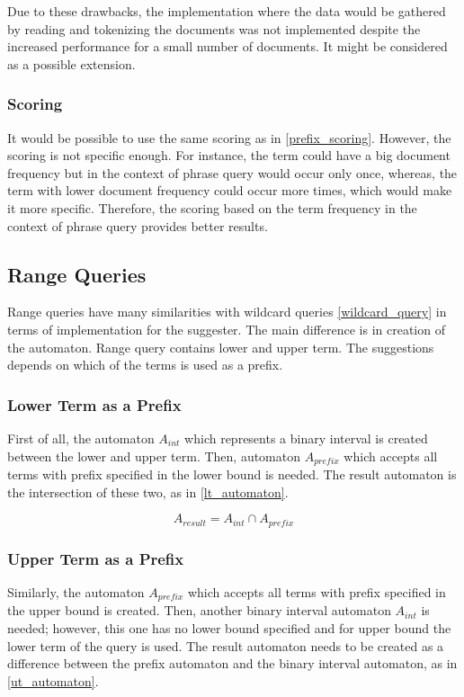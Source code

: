Due to these drawbacks, the implementation where the data would be gathered by reading and tokenizing the documents was not
implemented despite the increased performance for a small number of documents. It might be considered as a possible
extension.

\subsubsection{Scoring}
It would be possible to use the same scoring as in \ref{prefix_scoring}. However, the scoring is not specific enough.
For instance, the term could have a big document frequency but in the context of phrase query would occur only once,
whereas, the term with lower document frequency could occur more times, which would make it more specific. Therefore,
the scoring based on the term frequency in the context of phrase query provides better results.

\subsection{Range Queries}
Range queries have many similarities with wildcard queries \ref{wildcard_query} in terms of implementation for the
suggester. The main difference is in creation of the automaton. Range query contains lower and upper term. The
suggestions depends on which of the terms is used as a prefix.

\subsubsection{Lower Term as a Prefix}
First of all, the automaton $A_{int}$ which represents a binary interval is created between the lower and upper term. Then,
automaton $A_{prefix}$ which accepts all terms with prefix specified in the lower bound is needed. The result automaton is the
intersection of these two, as in \ref{lt_automaton}.

\begin{equation}
\label{lt_automaton}
A_{result} = A_{int} \cap A_{prefix}
\end{equation}

\subsubsection{Upper Term as a Prefix}
Similarly, the automaton $A_{prefix}$ which accepts all terms with prefix specified in the upper bound is created. Then,
another binary interval automaton $A_{int}$ is needed; however, this one has no lower bound specified and for upper bound the
lower term of the query is used. The result automaton needs to be created as a difference between the prefix automaton
and the binary interval automaton, as in \ref{ut_automaton}.

